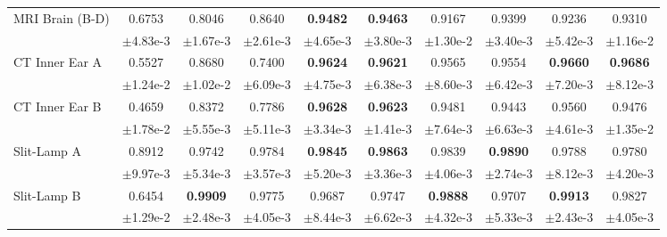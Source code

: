 \begin{table}[!htbp]
\begin{tabular}{l|*{9}{c|}}
      {\scriptsize MRI Brain (B-D)} & \scriptsize 0.6753 & \scriptsize 0.8046 & \scriptsize 0.8640 & {\color{red} \textbf{\scriptsize 0.9482}} & \textbf{\scriptsize 0.9463} & \scriptsize 0.9167 & \scriptsize 0.9399 & \scriptsize 0.9236 & \scriptsize 0.9310 \\[-4pt]
       & \tiny $\pm$4.83e-3 & \tiny $\pm$1.67e-3 & \tiny $\pm$2.61e-3 & \tiny $\pm$4.65e-3 & \tiny $\pm$3.80e-3 & \tiny $\pm$1.30e-2 & \tiny $\pm$3.40e-3 & \tiny $\pm$5.42e-3 & \tiny $\pm$1.16e-2 \\\midrule\midrule
      {\scriptsize CT Inner Ear A} & \scriptsize 0.5527 & \scriptsize 0.8680 & \scriptsize 0.7400 & \textbf{\scriptsize 0.9624} & \textbf{\scriptsize 0.9621} & \scriptsize 0.9565 & \scriptsize 0.9554 & \textbf{\scriptsize 0.9660} & {\color{red} \textbf{\scriptsize 0.9686}} \\[-4pt]
       & \tiny $\pm$1.24e-2 & \tiny $\pm$1.02e-2 & \tiny $\pm$6.09e-3 & \tiny $\pm$4.75e-3 & \tiny $\pm$6.38e-3 & \tiny $\pm$8.60e-3 & \tiny $\pm$6.42e-3 & \tiny $\pm$7.20e-3 & \tiny $\pm$8.12e-3 \\\midrule
      {\scriptsize CT Inner Ear B} & \scriptsize 0.4659 & \scriptsize 0.8372 & \scriptsize 0.7786 & {\color{red} \textbf{\scriptsize 0.9628}} & \textbf{\scriptsize 0.9623} & \scriptsize 0.9481 & \scriptsize 0.9443 & \scriptsize 0.9560 & \scriptsize 0.9476 \\[-4pt]
       & \tiny $\pm$1.78e-2 & \tiny $\pm$5.55e-3 & \tiny $\pm$5.11e-3 & \tiny $\pm$3.34e-3 & \tiny $\pm$1.41e-3 & \tiny $\pm$7.64e-3 & \tiny $\pm$6.63e-3 & \tiny $\pm$4.61e-3 & \tiny $\pm$1.35e-2 \\\midrule\midrule
      {\scriptsize Slit-Lamp A} & \scriptsize 0.8912 & \scriptsize 0.9742 & \scriptsize 0.9784 & \textbf{\scriptsize 0.9845} & \textbf{\scriptsize 0.9863} & \scriptsize 0.9839 & {\color{red} \textbf{\scriptsize 0.9890}} & \scriptsize 0.9788 & \scriptsize 0.9780 \\[-4pt]
       & \tiny $\pm$9.97e-3 & \tiny $\pm$5.34e-3 & \tiny $\pm$3.57e-3 & \tiny $\pm$5.20e-3 & \tiny $\pm$3.36e-3 & \tiny $\pm$4.06e-3 & \tiny $\pm$2.74e-3 & \tiny $\pm$8.12e-3 & \tiny $\pm$4.20e-3 \\\midrule
      {\scriptsize Slit-Lamp B} & \scriptsize 0.6454 & \textbf{\scriptsize 0.9909} & \scriptsize 0.9775 & \scriptsize 0.9687 & \scriptsize 0.9747 & \textbf{\scriptsize 0.9888} & \scriptsize 0.9707 & {\color{red} \textbf{\scriptsize 0.9913}} & \scriptsize 0.9827 \\[-4pt]
       & \tiny $\pm$1.29e-2 & \tiny $\pm$2.48e-3 & \tiny $\pm$4.05e-3 & \tiny $\pm$8.44e-3 & \tiny $\pm$6.62e-3 & \tiny $\pm$4.32e-3 & \tiny $\pm$5.33e-3 & \tiny $\pm$2.43e-3 & \tiny $\pm$4.05e-3 \\\midrule

\end{tabular}
\end{table}
